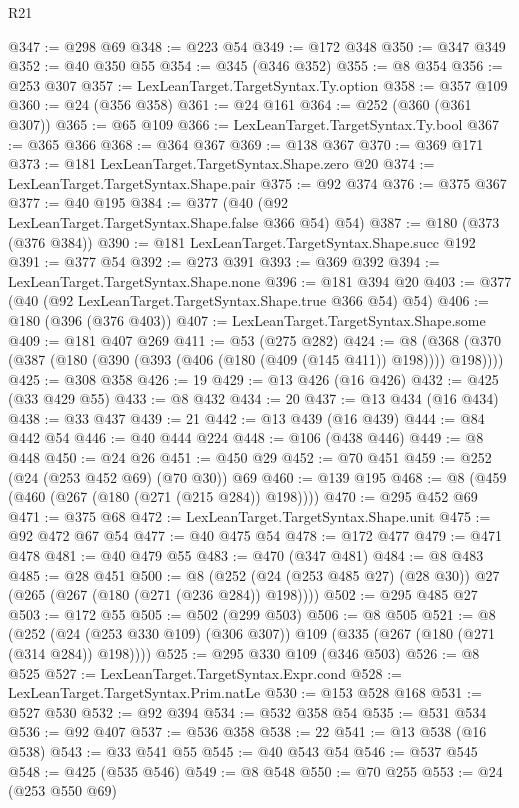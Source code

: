 \begin{lexlean}{R21}
\begin{coremodule}
@347 := @298 @69
@348 := @223 @54
@349 := @172 @348
@350 := @347 @349
@352 := @40 @350 @55
@354 := @345 (@346 @352)
@355 := @8 @354
@356 := @253 @307
@357 := LexLeanTarget.TargetSyntax.Ty.option
@358 := @357 @109
@360 := @24 (@356 @358)
@361 := @24 @161
@364 := @252 (@360 (@361 @307))
@365 := @65 @109
@366 := LexLeanTarget.TargetSyntax.Ty.bool
@367 := @365 @366
@368 := @364 @367
@369 := @138 @367
@370 := @369 @171
@373 := @181 LexLeanTarget.TargetSyntax.Shape.zero @20
@374 := LexLeanTarget.TargetSyntax.Shape.pair
@375 := @92 @374
@376 := @375 @367
@377 := @40 @195
@384 := @377 (@40 (@92 LexLeanTarget.TargetSyntax.Shape.false @366 @54) @54)
@387 := @180 (@373 (@376 @384))
@390 := @181 LexLeanTarget.TargetSyntax.Shape.succ @192
@391 := @377 @54
@392 := @273 @391
@393 := @369 @392
@394 := LexLeanTarget.TargetSyntax.Shape.none
@396 := @181 @394 @20
@403 := @377 (@40 (@92 LexLeanTarget.TargetSyntax.Shape.true @366 @54) @54)
@406 := @180 (@396 (@376 @403))
@407 := LexLeanTarget.TargetSyntax.Shape.some
@409 := @181 @407 @269
@411 := @53 (@275 @282)
@424 := @8 (@368 (@370 (@387 (@180 (@390 (@393 (@406 (@180 (@409 (@145 @411)) @198)))) @198))))
@425 := @308 @358
@426 := 19
@429 := @13 @426 (@16 @426)
@432 := @425 (@33 @429 @55)
@433 := @8 @432
@434 := 20
@437 := @13 @434 (@16 @434)
@438 := @33 @437
@439 := 21
@442 := @13 @439 (@16 @439)
@444 := @84 @442 @54
@446 := @40 @444 @224
@448 := @106 (@438 @446)
@449 := @8 @448
@450 := @24 @26
@451 := @450 @29
@452 := @70 @451
@459 := @252 (@24 (@253 @452 @69) (@70 @30)) @69
@460 := @139 @195
@468 := @8 (@459 (@460 (@267 (@180 (@271 (@215 @284)) @198))))
@470 := @295 @452 @69
@471 := @375 @68
@472 := LexLeanTarget.TargetSyntax.Shape.unit
@475 := @92 @472 @67 @54
@477 := @40 @475 @54
@478 := @172 @477
@479 := @471 @478
@481 := @40 @479 @55
@483 := @470 (@347 @481)
@484 := @8 @483
@485 := @28 @451
@500 := @8 (@252 (@24 (@253 @485 @27) (@28 @30)) @27 (@265 (@267 (@180 (@271 (@236 @284)) @198))))
@502 := @295 @485 @27
@503 := @172 @55
@505 := @502 (@299 @503)
@506 := @8 @505
@521 := @8
    (@252 (@24 (@253 @330 @109) (@306 @307)) @109 (@335 (@267 (@180 (@271 (@314 @284)) @198))))
@525 := @295 @330 @109 (@346 @503)
@526 := @8 @525
@527 := LexLeanTarget.TargetSyntax.Expr.cond
@528 := LexLeanTarget.TargetSyntax.Prim.natLe
@530 := @153 @528 @168
@531 := @527 @530
@532 := @92 @394
@534 := @532 @358 @54
@535 := @531 @534
@536 := @92 @407
@537 := @536 @358
@538 := 22
@541 := @13 @538 (@16 @538)
@543 := @33 @541 @55
@545 := @40 @543 @54
@546 := @537 @545
@548 := @425 (@535 @546)
@549 := @8 @548
@550 := @70 @255
@553 := @24 (@253 @550 @69)

\end{coremodule}
\end{lexlean}
